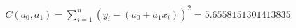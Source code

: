 \documentclass[preview]{standalone}
\begin{document}
\begin{align*}
C(a_0, a_1) = \sum_{i=1}^{n} (y_i - (a_0 + a_1x_i))^2 =5.6558151301413835
\end{align*}
\end{document}
